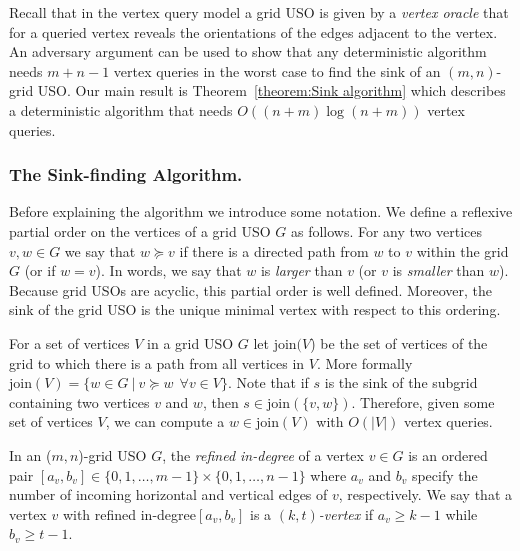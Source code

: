 \documentclass[runningheads,a4paper]{llncs}
\newcommand{\JN}[1]{\marginpar{\parbox{3.6cm}{{\small {\bf JN:} #1}}}} %
\newcommand{\indegree}{refined in-degree\xspace}
\newcommand{\join}{\mbox{join}\xspace}
\begin{document}
Recall that in the vertex query model a grid USO is given by a \emph{vertex oracle} that for a queried vertex reveals the orientations of the edges adjacent to the vertex. 
An adversary argument can be used to show that any deterministic algorithm needs $m+n-1$ vertex queries in the worst case to find the sink of an $(m, n)$-grid USO.
Our main result is Theorem~\ref{theorem:Sink algorithm} which describes a deterministic algorithm that needs $O((n + m) \log (n + m))$ vertex queries. 

\subsubsection{The Sink-finding Algorithm.}
\label{section:the_sink_finding_algorithm}

Before explaining the algorithm we introduce some notation. We define a reflexive partial order on the vertices of a grid USO $G$ as follows. 
For any two vertices $v,w \in G$ we say that $w \succeq v$ if there is a directed path from $w$ to $v$ within the grid $G$ (or if $w = v$). 
In words, we say that $w$ is \emph{larger} than $v$ (or $v$ is \emph{smaller} than $w$).
Because grid USOs are acyclic, this partial order is well defined.
Moreover, the sink of the grid USO is the unique minimal vertex with respect to this ordering. 

For a set of vertices $V$ in a grid USO $G$ let $\join(V$) be the set of vertices of the grid to which there is a path from all vertices in $V$.  More formally $\join(V) = \{w \in G \: | \: v \succeq w \:\: \forall v \in V \}$. Note that if $s$ is the sink of the subgrid containing two vertices $v$ and $w$, then $s \in \join(\{v,w\})$. Therefore, given some set of vertices $V$, we can compute a $w \in \join(V)$ with $O(|V|)$ vertex queries.


In an ($m,n$)-grid USO $G$, the \emph{\indegree} of a vertex $v \in G$ is an ordered pair $[a_v, b_v] \in \{0,1,\ldots,m-1\}\times \{0,1,\ldots,n-1\}$ where $a_v$ and $b_v$ specify the number of incoming horizontal  and vertical edges of $v$, respectively.
We say that a vertex $v$ with \indegree $[a_v, b_v]$ is a \emph{$(k, t)$-vertex} if $a_v\geq k-1$ while $b_v\geq t-1$.
\end{document}
